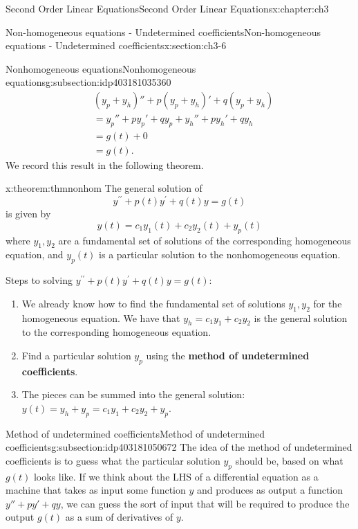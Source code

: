 \documentclass[oneside,10pt,]{book}
\newcommand{\terminology}[1]{\textbf{#1}}
\numberwithin{equation}{section}
\numberwithin{equation}{section}
\newcommand{\amp}{&}
\begin{document}
\begin{chapterptx}{Second Order Linear Equations}{}{Second Order Linear Equations}{}{}{x:chapter:ch3}
\begin{sectionptx}{Non-homogeneous equations - Undetermined coefficients}{}{Non-homogeneous equations - Undetermined coefficients}{}{}{x:section:ch3-6}
\begin{subsectionptx}{Nonhomogeneous equations}{}{Nonhomogeneous equations}{}{}{g:subsection:idp403181035360}
\begin{align*}
\amp(y_p + y_h)'' + p(y_p + y_h)' + q(y_p + y_h)\\
\amp= y_p'' + py_p' +q y_p + y_h'' +p y_h' + qy_h \\
\amp= g(t) + 0 \\
\amp= g(t).
\end{align*}
We record this result in the following theorem.%
\begin{theorem}{}{}{x:theorem:thmnonhom}%
The general solution of%
\begin{equation*}
y^{\prime\prime}+p(t)y^{\prime}+q(t)y=g(t)
\end{equation*}
is given by%
\begin{equation*}
y(t)=c_{1}y_{1}(t)+c_{2}y_{2}(t)+y_{p}(t)
\end{equation*}
where \(y_{1},y_{2}\) are a fundamental set of solutions of the corresponding homogeneous equation, and \(y_{p}(t)\) is a particular solution to the nonhomogeneous equation.%
\end{theorem}
Steps to solving \(y^{\prime\prime}+p(t)y^{\prime}+q(t)y=g(t):\)%
\begin{enumerate}
\item{}We already know how to find the fundamental set of solutions \(y_{1},y_{2}\) for the homogeneous equation. We have that \(y_{h}=c_{1}y_{1}+c_{2}y_{2}\) is the general solution to the corresponding homogeneous equation.%
\item{}Find a particular solution \(y_{p}\) using the \terminology{method of undetermined coefficients}.%
\item{}The pieces can be summed into the general solution: \(y(t)=y_{h}+y_{p}=c_{1}y_{1}+c_{2}y_{2}+y_{p}\).%
\end{enumerate}
%
\end{subsectionptx}
%
%
\typeout{************************************************}
\typeout{************************************************}
%
\begin{subsectionptx}{Method of undetermined coefficients}{}{Method of undetermined coefficients}{}{}{g:subsection:idp403181050672}
The idea of the method of undetermined coefficients is to guess what the particular solution \(y_{p}\) should be, based on what \(g(t)\) looks like. If we think about the LHS of a differential equation as a machine that takes as input some function \(y\) and produces as output a function \(y'' + py' + qy\), we can guess the sort of input that will be required to produce the output \(g(t)\) as a sum of derivatives of \(y\).%

\end{subsectionptx}
\end{sectionptx}
\end{chapterptx}
\end{document}

